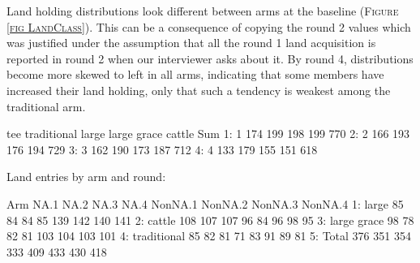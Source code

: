 Land holding distributions look different between arms at the baseline (\textsc{\small Figure \ref{fig LandClass}}). This can be a consequence of copying the round 2 values which was justified under the assumption that all the round 1 land acquisition is reported in round 2 when our interviewer asks about it. %
By round 4, distributions become more skewed to left in all arms, indicating that some members have increased their land holding, only that such a tendency is weakest among the \textsf{traditional} arm. 




\begin{Schunk}
\begin{Soutput}
   tee traditional large large grace cattle Sum
1:   1         174   199         198    199 770
2:   2         166   193         176    194 729
3:   3         162   190         173    187 712
4:   4         133   179         155    151 618
\end{Soutput}
\end{Schunk}
Land entries by arm and round:
\begin{Schunk}
\begin{Soutput}
           Arm NA.1 NA.2 NA.3 NA.4 NonNA.1 NonNA.2 NonNA.3 NonNA.4
1:       large   85   84   84   85     139     142     140     141
2:      cattle  108  107  107   96      84      96      98      95
3: large grace   98   78   82   81     103     104     103     101
4: traditional   85   82   81   71      83      91      89      81
5:       Total  376  351  354  333     409     433     430     418
\end{Soutput}
\end{Schunk}


